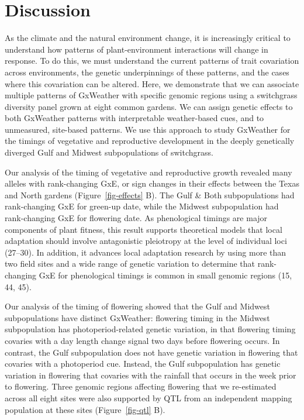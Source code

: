 \documentclass[
  9pt,
  twocolumn,
  twoside]{pnas-new}
\begin{document}
\section{Discussion}\label{discussion}

As the climate and the natural environment change, it is increasingly
critical to understand how patterns of plant-environment interactions
will change in response. To do this, we must understand the current
patterns of trait covariation across environments, the genetic
underpinnings of these patterns, and the cases where this covariation
can be altered. Here, we demonstrate that we can associate multiple
patterns of GxWeather with specific genomic regions using a switchgrass
diversity panel grown at eight common gardens. We can assign genetic
effects to both GxWeather patterns with interpretable weather-based
cues, and to unmeasured, site-based patterns. We use this approach to
study GxWeather for the timings of vegetative and reproductive
development in the deeply genetically diverged Gulf and Midwest
subpopulations of switchgrass.

Our analysis of the timing of vegetative and reproductive growth
revealed many alleles with rank-changing GxE, or sign changes in their
effects between the Texas and North gardens (Figure~\ref{fig-effects}
B). The Gulf \& Both subpopulations had rank-changing GxE for green-up
date, while the Midwest subpopulation had rank-changing GxE for
flowering date. As phenological timings are major components of plant
fitness, this result supports theoretical models that local adaptation
should involve antagonistic pleiotropy at the level of individual loci
(27--30). In addition, it advances local adaptation research by using
more than two field sites and a wide range of genetic variation to
determine that rank-changing GxE for phenological timings is common in
small genomic regions (15, 44, 45).

Our analysis of the timing of flowering showed that the Gulf and Midwest
subpopulations have distinct GxWeather: flowering timing in the Midwest
subpopulation has photoperiod-related genetic variation, in that
flowering timing covaries with a day length change signal two days
before flowering occurs. In contrast, the Gulf subpopulation does not
have genetic variation in flowering that covaries with a photoperiod
cue. Instead, the Gulf subpopulation has genetic variation in flowering
that covaries with the rainfall that occurs in the week prior to
flowering. Three genomic regions affecting flowering that we
re-estimated across all eight sites were also supported by QTL from an
independent mapping population at these sites (Figure~\ref{fig-qtl} B).
\end{document}
